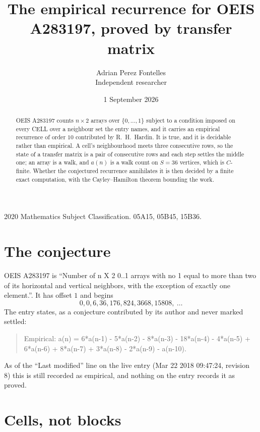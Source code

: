 \documentclass[11pt,a4paper]{article}
\title{The empirical recurrence for OEIS A283197, proved by transfer matrix}
\author{Adrian Perez Fontelles\\ \small Independent researcher}
\date{1 September 2026}
\theoremstyle{plain}
\theoremstyle{definition}
\begin{document}
\maketitle

\begin{abstract}
OEIS A283197 counts $n\times2$ arrays over $\{0,\dots,1\}$ subject to a condition imposed on
every CELL over a neighbour set the entry names, and it carries an empirical recurrence of
order $10$ contributed by R.~H.~Hardin. It is true, and it is decidable rather than
empirical. A cell's neighbourhood meets three consecutive rows, so the state of a transfer
matrix is a pair of consecutive rows and each step settles the middle one; an array is a
walk, and $a(n)$ is a walk count on $S=36$ vertices, which is $C$-finite. Whether the
conjectured recurrence annihilates it is then decided by a finite exact computation, with the
Cayley--Hamilton theorem bounding the work.
\end{abstract}

\noindent\small 2020 Mathematics Subject Classification. 05A15, 05B45, 15B36.\normalsize

\section{The conjecture}

OEIS A283197 is ``Number of n X 2 0..1 arrays with no 1 equal to more than two of its horizontal and vertical neighbors, with the exception of exactly one element.''. It has offset $1$ and begins
\[
0, 0, 6, 36, 176, 824, 3668, 15808,\ \dots
\]
The entry states, as a conjecture contributed by its author and never marked settled:
\begin{quote}
Empirical: a(n) = 6*a(n-1) - 5*a(n-2) - 8*a(n-3) - 18*a(n-4) - 4*a(n-5) + 6*a(n-6) + 8*a(n-7) + 3*a(n-8) - 2*a(n-9) - a(n-10).
\end{quote}
As of the ``Last modified'' line on the live entry (Mar 22 2018 09:47:24, revision 8) this is still
recorded as empirical, and nothing on the entry records it as proved.

\section{Cells, not blocks}
\end{document}
